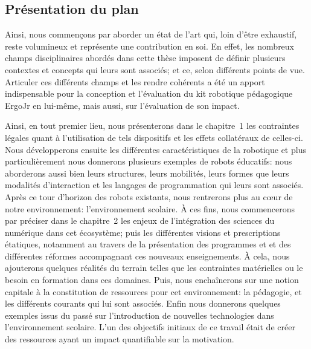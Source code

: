 \subsection*{Présentation du plan}
        Ainsi, nous commençons par aborder un état de l'art qui, loin d'être exhaustif, reste volumineux et représente une contribution en soi.
        En effet, les nombreux champs disciplinaires abordés dans cette thèse imposent de définir plusieurs contextes et concepts qui leurs sont associés; et ce, selon différents points de vue.
        Articuler ces différents champs et les rendre cohérents a été un apport indispensable pour la conception et l'évaluation du kit robotique pédagogique ErgoJr en lui-même, mais aussi, sur l'évaluation de son impact.\par%
            Ainsi, en tout premier lieu, nous présenterons dans le chapitre~1 les contraintes légales quant à l'utilisation de tels dispositifs et les effets collatéraux de celles-ci.
            Nous développerons ensuite les différentes caractéristiques de la robotique et plus particulièrement nous donnerons plusieurs exemples de robots éducatifs: nous aborderons aussi bien leurs structures, leurs mobilités, leurs formes que leurs modalités d'interaction et les langages de programmation qui leurs sont associés.%
            Après ce tour d'horizon des robots existants, nous rentrerons plus au cœur de notre environnement: l'environnement scolaire.
            À ces fins, nous commencerons par préciser dans le chapitre~2 les enjeux de l'intégration des sciences du numérique dans cet écosystème; puis les différentes visions et prescriptions étatiques, notamment au travers de la présentation des programmes  et  et des différentes réformes accompagnant ces nouveaux enseignements.
            À cela, nous ajouterons quelques réalités du terrain telles que les contraintes matérielles ou le besoin en formation dans ces domaines.
            Puis, nous enchaînerons sur une notion capitale à la constitution de ressources pour cet environnement: la pédagogie, et les différents courants qui lui sont associés. Enfin nous donnerons quelques exemples issus du passé sur l'introduction de nouvelles technologies dans l'environnement scolaire.%
            L'un des objectifs initiaux de ce travail était de créer des ressources ayant un impact quantifiable sur la motivation.
